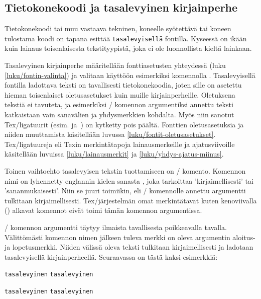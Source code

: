 \subsection{Tietokonekoodi ja tasalevyinen kirjainperhe}

Tietokonekoodi tai muu vastaava tekninen, koneelle syötettävä tai koneen
tulostama koodi on tapana esittää \texttt{tasalevyisellä} fontilla.
Kyseessä on ikään kuin lainaus toisenlaisesta tekstityypistä, joka ei
ole luonnollista kieltä lainkaan.

Tasalevyinen kirjainperhe määritellään fonttiasetusten yhteydessä (luku
\ref{luku/fontin-valinta}) ja valitaan käyttöön esimerkiksi komennolla
. Tasalevyisellä fontilla ladottava teksti on
tavallisesti tietokonekoodia, joten sille on asetettu hieman
toisenlaiset oletusasetukset kuin muille kirjainperheille. Oletuksena
tekstiä ei tavuteta, ja esimerkiksi \-/ komennon
argumentiksi annettu teksti katkaistaan vain sanavälien ja yhdysmerkkien
kohdalta. Myös niin sanotut Tex\-/ligatuurit (esim. 
ja~\koodi{--}) on kytketty pois päältä. Fonttien oletusasetuksia ja
niiden muuttamista käsitellään luvussa
\ref{luku/fontit-oletusasetukset}. Tex\-/ligatuureja eli Texin
merkintätapoja lainausmerkeille ja ajatusviivoille käsitellään luvuissa
\ref{luku/lainausmerkit} ja \ref{luku/yhdys-ajatus-miinus}.

Toinen vaihtoehto tasalevyisen tekstin tuottamiseen on
\-/ komento. Komennon nimi on lyhennetty englannin kielen
sanasta , joka tarkoittaa 'kirjaimellisesti' tai
'sananmukaisesti'. Niin se juuri toimiikin, eli \-/
komennolle annettu argumentti tulkitaan kirjaimellisesti.
Tex\-/järjestelmän omat merkintätavat kuten kenoviivalla (\koodi{\keno})
alkavat komennot eivät toimi tämän komennon argumentissa.

\-/ komennon argumentti täytyy ilmaista tavallisesta
poikkeavalla tavalla. Välittömästi komennon nimen jälkeen tuleva merkki
on oleva argumentin aloitus- ja lopetusmerkki. Niiden välissä oleva
teksti tulkitaan kirjaimellisesti ja ladotaan tasalevyisellä
kirjainperheellä. Seuraavassa on tästä kaksi esimerkkiä:

\begin{koodilohkosis}
\verb.tasalevyinen.   %
\verb|tasalevyinen|   %
\end{koodilohkosis}

\begin{tulossis}
  \verb.tasalevyinen.
  \verb|tasalevyinen|
\end{tulossis}

